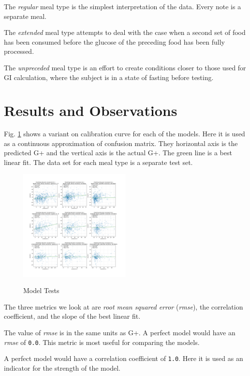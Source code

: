 \documentclass[conference]{IEEEtran}
\begin{document}
The \emph{regular} meal type is the simplest interpretation of the data. Every note is a separate meal.

The \emph{extended} meal type attempts to deal with the case when a second set of food has been consumed before the glucose of the preceding food has been fully processed.

The \emph{unpreceded} meal type is an effort to create conditions closer to those used for GI calculation, where the subject is in a state of fasting before testing.

\section{Results and Observations}

Fig. \ref{fig:all_models_tested} shows a variant on calibration curve for each of the models. Here it is used as a continuous approximation of confusion matrix. They horizontal axis is the predicted G+ and the vertical axis is the actual G+. The green line is a best linear fit. The data set for each meal type is a separate test set.

\begin{figure}[tbp]
    \includegraphics[width=0.5\textwidth]{images/gplus_all_models.png}
    \label{fig:all_models_tested}
    \caption{Model Tests}
\end{figure}

The three metrics we look at are \emph{root mean squared error} (\emph{rmse}), the correlation coefficient, and the slope of the best linear fit.

The value of \emph{rmse} is in the same units as G+. A perfect model would have an \emph{rmse} of \texttt{0.0}. This metric is most useful for comparing the models.

A perfect model would have a correlation coefficient of \texttt{1.0}. Here it is used as an indicator for the strength of the model.
\end{document}
